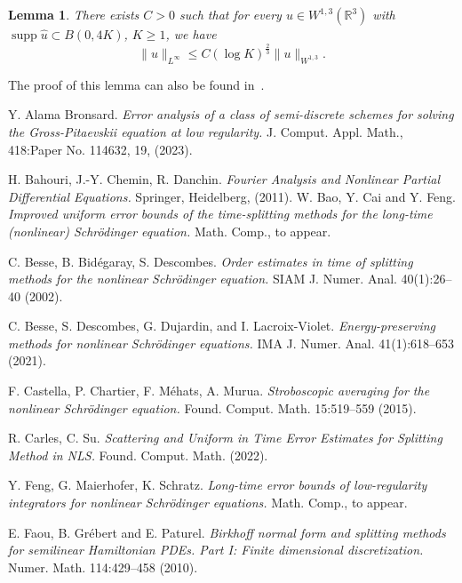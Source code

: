 \documentclass[10pt,a4paper]{article}
\newtheorem{lemma}[theorem]{Lemma}
\DeclareMathOperator{\supp}{supp}
\begin{document}
  \begin{lemma}\label{sobbord}
    There exists \(C>0\) such that for every \(u\in W^{1,3}(\mathbb R^3)\) with
    \(\supp \hat{u} \subset B(0,4K)\), \(K \geq 1\), we have
    \[ \|u\|_{L^\infty} \leq C (\log K)^\frac23 \|u\|_{W^{1,3}}. \]
  \end{lemma}

  The proof of this lemma can also be found in~\cite{ORS21}.

  \begin{thebibliography}{99}
      {\rm Y. Alama Bronsard.}
      {\em Error analysis of a class of semi-discrete schemes for solving the Gross-Pitaevskii equation at low regularity.}
      J. Comput. Appl. Math., 418:Paper No. 114632, 19, (2023).

      {\rm H. Bahouri, J.-Y. Chemin, R. Danchin.}
      {\em Fourier Analysis and Nonlinear Partial Differential Equations.}
      Springer, Heidelberg, (2011).
      {\rm W. Bao, Y. Cai and Y. Feng.}
      {\em Improved uniform error bounds of the time-splitting methods for the long-time (nonlinear) Schr\"odinger equation.}
      Math. Comp., to appear.

      {\rm C. Besse, B. Bid\'egaray, S. Descombes.}
      {\em Order estimates in time of splitting methods for the nonlinear Schr\"odinger equation.}
      SIAM J. Numer. Anal. 40(1):26--40 (2002).
      
      {\rm C. Besse, S. Descombes, G. Dujardin, and I. Lacroix-Violet.}
      {\em Energy-preserving methods for nonlinear Schr\"odinger equations.}
      IMA J. Numer. Anal. 41(1):618--653 (2021).
      
      {\rm F. Castella, P. Chartier, F. Méhats, A. Murua.}
      {\em Stroboscopic averaging for the nonlinear Schr\"odinger equation.}
      Found. Comput. Math. 15:519--559 (2015).

      {\rm R. Carles, C. Su.}
      {\em Scattering and Uniform in Time Error Estimates for Splitting Method in NLS.}
      Found. Comput. Math. (2022).

      {\rm Y. Feng, G. Maierhofer, K. Schratz.}
      {\em Long-time error bounds of low-regularity integrators for nonlinear Schrödinger equations.}
      Math. Comp., to appear.

      {\rm E. Faou, B. Grébert and E. Paturel.} 
      {\em Birkhoff normal form and splitting methods for semilinear Hamiltonian PDEs. Part I: Finite dimensional discretization.}
      Numer. Math. 114:429--458 (2010).


\end{thebibliography}
\end{document}
